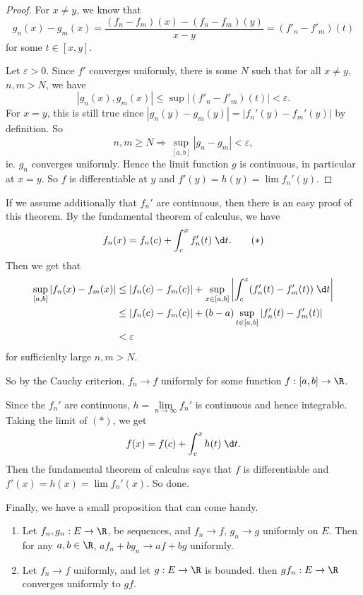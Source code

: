 \documentclass[a4paper]{article}
\begin{document}
\begin{proof}
  For $x \not = y$, we know that
  \[
    g_n(x) - g_m(x) = \frac{(f_n - f_m)(x) - (f_n - f_m)(y)}{x - y} = (f'_n - f'_m)(t)
  \]
  for some $t \in [x, y]$.

  Let $\varepsilon > 0$. Since $f'$ converges uniformly, there is some $N$ such that for all $x\not= y$, $n, m > N$, we have
  \[
    |g_n(x), g_m(x)| \leq \sup |(f'_n - f'_m)(t)| < \varepsilon.
  \]
  For $x = y$, this is still true since $|g_n(y) - g_m(y)| = |f_n'(y) - f_m'(y)|$ by definition. So
  \[
    n, m\geq N \Rightarrow \sup_{[a, b]}|g_n - g_m| < \varepsilon,
  \]
  ie. $g_n$ converges uniformly. Hence the limit function $g$ is continuous, in particular at $x = y$. So $f$ is differentiable at $y$ and $f'(y) = h(y) = \lim f_n'(y)$.
\end{proof}

If we assume additionally that $f_n'$ are continuous, then there is an easy proof of this theorem. By the fundamental theorem of calculus, we have
\[
  f_n(x) = f_n(c) + \int_c^x f_n'(t)\;\d t.\tag{$*$}
\]
Then we get that
\begin{align*}
  \sup_{[a, b]}|f_n(x) - f_m(x)| &\leq |f_n(c) - f_m(c)| + \sup_{x\in [a, b]}\left|\int_c^x (f_n'(t) - f_m'(t))\;\d t\right|\\
  &\leq |f_n(c) - f_m(c)| + (b - a)\sup_{t\in [a, b]}|f_n'(t) - f_m'(t)|\\
  &< \varepsilon
\end{align*}
for sufficienlty large $n, m> N$.

So by the Cauchy criterion, $f_n \to f$ uniformly for some function $f: [a, b] \to \R$.

Since the $f_n'$ are continuous, $h = \lim\limits_{n\to \infty} f_n'$ is continuous and hence integrable. Taking the limit of $(*)$, we get
\[
  f(x) = f(c) + \int_c^x h(t)\;\d t.
\]
Then the fundamental theorem of calculus says that $f$ is differentiable and $f'(x) = h(x) = \lim f_n'(x)$. So done.

Finally, we have a small proposition that can come handy.
\begin{prop}\leavevmode
  \begin{enumerate}
    \item Let $f_n, g_n: E\to \R$, be sequences, and $f_n \to f$, $g_n \to g$ uniformly on $E$. Then for any $a, b\in \R$, $af_n + bg_n \to af + bg$ uniformly.
    \item Let $f_n \to f$ uniformly, and let $g: E\to \R$ is bounded. then $gf_n: E\to \R$ converges uniformly to $gf$.
  \end{enumerate}
\end{prop}
\end{document}

